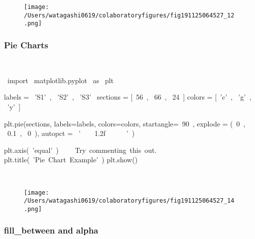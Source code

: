 \begin{figure}[H]
\centering
\texttt{[image: /Users/watagashi0619/colaboratoryfigures/fig191125064527\_12.png]}
\end{figure}
\subsubsection{Pie Charts}

\begin{paracol}{2}
\smallskip
\begin{cellExecute}[escapechar=~]
~~
\end{cellExecute}
\switchcolumn
\begin{codeCell}[escapechar=~]
~\textcolor{mtk17}{import}~ matplotlib.pyplot ~\textcolor{mtk17}{as}~ plt

labels = ~\textcolor{mtk25}{'S1'}~, ~\textcolor{mtk25}{'S2'}~, ~\textcolor{mtk25}{'S3'}~
sections = [~\textcolor{mtk7}{56}~, ~\textcolor{mtk7}{66}~, ~\textcolor{mtk7}{24}~]
colors = [~\textcolor{mtk25}{'c'}~, ~\textcolor{mtk25}{'g'}~, ~\textcolor{mtk25}{'y'}~]

plt.pie(sections, labels=labels, colors=colors,
        startangle=~\textcolor{mtk7}{90}~,
        explode = (~\textcolor{mtk7}{0}~, ~\textcolor{mtk7}{0.1}~, ~\textcolor{mtk7}{0}~),
        autopct = ~\textcolor{mtk25}{'}~~~~\textcolor{mtk25}{1.2f}~~~~~~\textcolor{mtk25}{'}~)

plt.axis(~\textcolor{mtk25}{'equal'}~) ~~~\textcolor{mtk8}{ Try commenting this out.}~
plt.title(~\textcolor{mtk25}{'Pie Chart Example'}~)
plt.show()
\end{codeCell}
\end{paracol}

\begin{paracol}{2}
\begin{cellExecute}[escapechar=~]
~~
\end{cellExecute}
\switchcolumn
\begin{resultCell}[escapechar=~]
\end{resultCell}
\end{paracol}

\begin{figure}[H]
\centering
\texttt{[image: /Users/watagashi0619/colaboratoryfigures/fig191125064527\_14.png]}
\end{figure}
\subsubsection{fill\_between and alpha}

